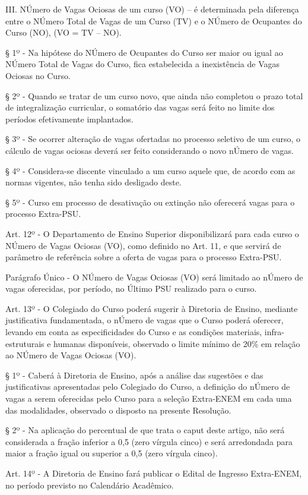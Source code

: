 III. NÚmero de Vagas Ociosas de um curso (VO) – é determinada pela diferença entre o NÚmero Total de Vagas de um Curso (TV) e o NÚmero de Ocupantes do Curso (NO), (VO = TV – NO).


§ 1º - Na hipótese do NÚmero de Ocupantes do Curso ser maior ou igual ao NÚmero Total de Vagas do Curso, fica estabelecida a inexistência de Vagas Ociosas no Curso.

§ 2º - Quando se tratar de um curso novo, que ainda não completou o prazo total de integralização curricular, o somatório das vagas será feito no limite dos períodos efetivamente implantados.

§ 3º - Se ocorrer alteração de vagas ofertadas no processo seletivo de um curso, o cálculo de vagas ociosas deverá ser feito considerando o novo nÚmero de vagas.

§ 4º - Considera-se discente vinculado a um curso aquele que, de acordo com as normas vigentes, não tenha sido desligado deste.

§ 5º - Curso em processo de desativação ou extinção não oferecerá vagas para o processo Extra-PSU.

Art. 12º - O Departamento de Ensino Superior disponibilizará para cada curso o NÚmero de Vagas Ociosas (VO), como definido no Art. 11, e que servirá de parâmetro de referência sobre a oferta de vagas para o processo Extra-PSU.

Parágrafo Único - O NÚmero de Vagas Ociosas (VO) será limitado ao nÚmero de vagas oferecidas, por período, no Último PSU realizado para o curso.

Art. 13º - O Colegiado do Curso poderá sugerir à Diretoria de Ensino, mediante justificativa fundamentada, o nÚmero de vagas que o Curso poderá oferecer, levando em conta as especificidades do Curso e as condições materiais, infra-estruturais e humanas disponíveis, observado o limite mínimo de 20\% em relação ao NÚmero de Vagas Ociosas (VO).

§ 1º - Caberá à Diretoria de Ensino, após a análise das sugestões e das justificativas apresentadas pelo Colegiado do Curso, a definição do nÚmero de vagas a serem oferecidas pelo Curso para a seleção Extra-ENEM em cada uma das modalidades, observado o disposto na presente Resolução.

§ 2º - Na aplicação do percentual de que trata o caput deste artigo, não será considerada a fração inferior a 0,5 (zero vírgula cinco) e será arredondada para maior a fração igual ou superior a 0,5 (zero vírgula cinco).

Art. 14º - A Diretoria de Ensino fará publicar o Edital de Ingresso Extra-ENEM, no período previsto no Calendário Acadêmico.

